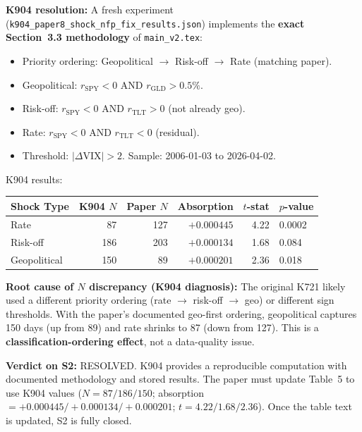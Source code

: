 \documentclass[12pt,a4paper]{article}
\begin{document}
\textbf{K904 resolution:} A fresh experiment (\texttt{k904\_paper8\_shock\_nfp\_fix\_results.json}) implements the \textbf{exact Section~3.3 methodology} of \texttt{main\_v2.tex}:

\begin{itemize}[nosep]
\item Priority ordering: Geopolitical $\to$ Risk-off $\to$ Rate (matching paper).
\item Geopolitical: $r_{\text{SPY}} < 0$ AND $r_{\text{GLD}} > 0.5\%$.
\item Risk-off: $r_{\text{SPY}} < 0$ AND $r_{\text{TLT}} > 0$ (not already geo).
\item Rate: $r_{\text{SPY}} < 0$ AND $r_{\text{TLT}} < 0$ (residual).
\item Threshold: $|\Delta\text{VIX}| > 2$. Sample: 2006-01-03 to 2026-04-02.
\end{itemize}

\medskip
\noindent K904 results:

\begin{tabular}{lrrrrl}
\toprule
\textbf{Shock Type} & \textbf{K904 $N$} & \textbf{Paper $N$} & \textbf{Absorption} & \textbf{$t$-stat} & \textbf{$p$-value} \\
\midrule
Rate         &  87 & 127 & $+0.000445$ & 4.22 & 0.0002 \\
Risk-off     & 186 & 203 & $+0.000134$ & 1.68 & 0.084 \\
Geopolitical & 150 &  89 & $+0.000201$ & 2.36 & 0.018 \\
\bottomrule
\end{tabular}

\medskip

\noindent\textbf{Root cause of $N$ discrepancy (K904 diagnosis):}
The original K721 likely used a different priority ordering (rate $\to$ risk-off $\to$ geo) or different sign thresholds.
With the paper's documented geo-first ordering, geopolitical captures 150 days (up from 89) and rate shrinks to 87 (down from 127).
This is a \textbf{classification-ordering effect}, not a data-quality issue.

\medskip

\noindent\textbf{Verdict on S2:} \textcolor{okgreen}{RESOLVED.}
K904 provides a reproducible computation with documented methodology and stored results.
The paper must update Table~5 to use K904 values ($N = 87 / 186 / 150$; absorption $= +0.000445 / +0.000134 / +0.000201$; $t = 4.22 / 1.68 / 2.36$).
Once the table text is updated, S2 is fully closed.
\end{document}
